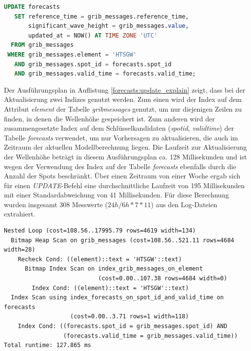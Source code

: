 \begin{lstlisting}[captionpos=b, caption=Aktualisierung der Wellenhöhe, label=forecasts:update, language=SQL]
UPDATE forecasts
   SET reference_time = grib_messages.reference_time,
       significant_wave_height = grib_messages.value,
       updated_at = NOW() AT TIME ZONE 'UTC'
  FROM grib_messages
 WHERE grib_messages.element = 'HTSGW'
   AND grib_messages.spot_id = forecasts.spot_id
   AND grib_messages.valid_time = forecasts.valid_time;
\end{lstlisting}

Der Ausführungsplan in Auflistung \ref{forecasts:update_explain}
zeigt, dass bei der Aktualisierung zwei Indizes genutzt werden. Zum
einen wird der Index auf dem Attribut \textit{element} der Tabelle
\textit{grib\textunderscore messages} genutzt, um nur diejenigen
Zeilen zu finden, in denen die Wellenhöhe gespeichert ist. Zum anderen
wird der zusammengesetzte Index auf dem Schlüsselkandidaten
(\textit{spot\textunderscore id, valid\textunderscore time}) der
Tabelle \textit{forecasts} verwendet, um nur Vorhersagen zu
aktualisieren, die auch im Zeitraum der aktuellen Modellberechnung
liegen. Die Laufzeit zur Aktualisierung der Wellenhöhe beträgt in
diesem Ausführungsplan ca. 128 Millisekunden und ist wegen der
Verwendung des Index auf der Tabelle \textit{forecasts} ebenfalls
durch die Anzahl der Spots beschränkt. Über einen Zeitraum von einer
Woche ergab sich für einen \textit{UPDATE}-Befehl eine
durchschnittliche Laufzeit von 195 Millisekunden mit einer
Standardabweichung von 41 Millisekunden. Für diese Berechnung wurden
insgesamt 308 Messwerte ($24h/6h * 7 * 11$) aus den Log-Dateien
extrahiert.

\begin{lstlisting}[captionpos=b, caption=Ausführungsplan der Aktualisierung, label=forecasts:update_explain]
Nested Loop (cost=108.56..17995.79 rows=4619 width=134)
  Bitmap Heap Scan on grib_messages (cost=108.56..521.11 rows=4684 width=28)
    Recheck Cond: ((element)::text = 'HTSGW'::text)
      Bitmap Index Scan on index_grib_messages_on_element  
                           (cost=0.00..107.38 rows=4684 width=0)
        Index Cond: ((element)::text = 'HTSGW'::text)
  Index Scan using index_forecasts_on_spot_id_and_valid_time on forecasts 
                   (cost=0.00..3.71 rows=1 width=118)
    Index Cond: ((forecasts.spot_id = grib_messages.spot_id) AND 
                 (forecasts.valid_time = grib_messages.valid_time))
Total runtime: 127.865 ms
\end{lstlisting}

